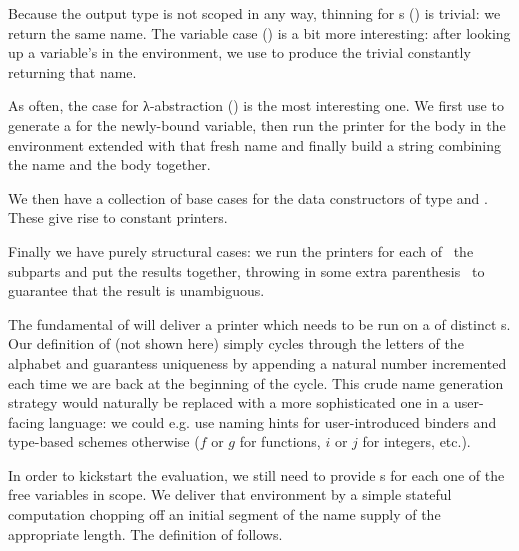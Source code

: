 Because the output type is not scoped in any way, thinning for s
() is trivial: we return the same name. The variable
case () is a bit more interesting: after looking up a variable's 
in the environment, we use  to produce the trivial  constantly
returning that name.


As often, the case for λ-abstraction () is the most interesting one.
We first use  to generate a  for the newly-bound variable,
then run the printer for the body in the environment extended with that fresh
name and finally build a string combining the name and the body together.


We then have a collection of base cases for the data constructors of type
 and . These give rise to constant printers.


Finally we have purely structural cases: we run the printers for each of~
the subparts and put the results together, throwing in some extra parenthesis~
to guarantee that the result is unambiguous.



The fundamental  of  will deliver a printer which needs to be run
on a  of distinct s. Our definition of  (not
shown here) simply cycles through the letters of the alphabet and guarantess
uniqueness by appending a natural number incremented each time we are back at
the beginning of the cycle. This crude name generation strategy would naturally
be replaced with a more sophisticated one in a user-facing language: we could
e.g. use naming hints for user-introduced binders and type-based schemes otherwise
($f$ or $g$ for functions, $i$ or $j$ for integers, etc.).

In order to kickstart the evaluation, we still need to provide s
for each one of the free variables in scope. We deliver that environment
by a simple stateful computation  chopping off an initial segment
of the name supply of the appropriate length. The definition of 
follows.

